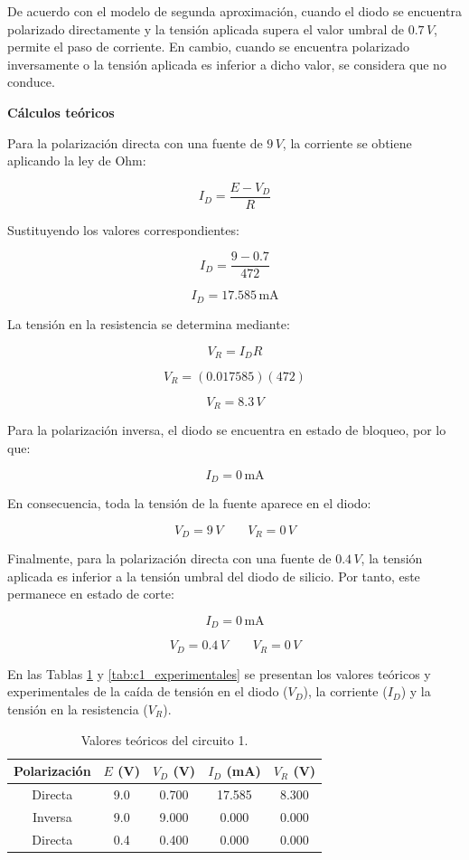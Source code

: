 \vspace{0.3cm}

De acuerdo con el modelo de segunda aproximación, cuando el diodo se encuentra polarizado directamente y la tensión aplicada supera el valor umbral de \(0.7\,V\), permite el paso de corriente. En cambio, cuando se encuentra polarizado inversamente o la tensión aplicada es inferior a dicho valor, se considera que no conduce.

\vspace{0.3cm}

\textbf{Cálculos teóricos}

Para la polarización directa con una fuente de \(9\,V\), la corriente se obtiene aplicando la ley de Ohm:

\[
I_D=\frac{E-V_D}{R}
\]

Sustituyendo los valores correspondientes:

\[
I_D=\frac{9-0.7}{472}
\]

\[
\boxed{I_D=17.585\,\text{mA}}
\]

La tensión en la resistencia se determina mediante:

\[
V_R=I_D R
\]

\[
V_R=(0.017585)(472)
\]

\[
\boxed{V_R=8.3\,V}
\]

Para la polarización inversa, el diodo se encuentra en estado de bloqueo, por lo que:

\[
\boxed{I_D=0\,\text{mA}}
\]

En consecuencia, toda la tensión de la fuente aparece en el diodo:

\[
\boxed{V_D=9\,V \qquad V_R=0\,V}
\]

Finalmente, para la polarización directa con una fuente de \(0.4\,V\), la tensión aplicada es inferior a la tensión umbral del diodo de silicio. Por tanto, este permanece en estado de corte:

\[
\boxed{I_D=0\,\text{mA}}
\]

\[
\boxed{V_D=0.4\,V \qquad V_R=0\,V}
\]

\vspace{0.3cm}

En las Tablas \ref{tab:c1_teoricos} y \ref{tab:c1_experimentales} se presentan los valores teóricos y experimentales de la caída de tensión en el diodo (\(V_D\)), la corriente (\(I_D\)) y la tensión en la resistencia (\(V_R\)).

\begin{table}[H]
\centering
\caption{Valores teóricos del circuito 1.}
\label{tab:c1_teoricos}
\scriptsize
\begin{tabular}{c c c c c}
\hline
\textbf{Polarización} & \(E\) (V) & \(V_D\) (V) &
\(I_D\) (mA) & \(V_R\) (V) \\
\hline
Directa & 9.0 & 0.700 & 17.585 & 8.300 \\
Inversa & 9.0 & 9.000 & 0.000 & 0.000 \\
Directa & 0.4 & 0.400 & 0.000 & 0.000 \\
\hline
\end{tabular}
\end{table}

